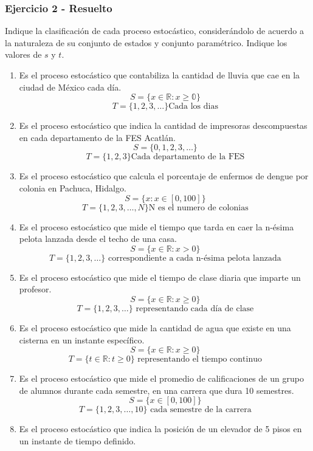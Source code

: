\documentclass{article}
\begin{document}
\subsubsection{Ejercicio 2 - Resuelto}

Indique la clasificación de cada proceso estocástico, considerándolo de acuerdo a la naturaleza de su conjunto de estados y conjunto paramétrico. Indique los valores de \( s \) y \( t \).

\begin{enumerate}
    \item Es el proceso estocástico que contabiliza la cantidad de lluvia que cae en la ciudad de México cada día.
          \[S = \{x \in \mathbb{R} : x \geq \mathbb{0}\}\]
          \[T = \{1,2,3,\dots\} \text{Cada los dias}\]
    \item Es el proceso estocástico que indica la cantidad de impresoras descompuestas en cada departamento de la FES Acatlán.
          \[S = \{0,1,2,3,\dots\} \]
          \[T = \{1,2,3\} \text{Cada departamento de la FES}\]
    \item Es el proceso estocástico que calcula el porcentaje de enfermos de dengue por colonia en Pachuca, Hidalgo.
          \[S = \{x : x \in [0, 100]\} \]
          \[T = \{1,2,3,\dots,N\} \text{N es el numero de colonias}\]
    \item Es el proceso estocástico que mide el tiempo que tarda en caer la n-ésima pelota lanzada desde el techo de una casa.
          \[S = \{x \in \mathbb{R} : x > 0\}\]
          \[ T = \{1,2,3,\dots\} \text{ correspondiente a cada n-ésima pelota lanzada} \]
    \item Es el proceso estocástico que mide el tiempo de clase diaria que imparte un profesor.
          \[ S = \{x \in \mathbb{R} : x \geq 0\} \]
          \[ T = \{1,2,3,\dots\} \text{ representando cada día de clase} \]
    \item Es el proceso estocástico que mide la cantidad de agua que existe en una cisterna en un instante específico.
          \[ S = \{x \in \mathbb{R} : x \geq 0\} \]
          \[ T = \{t \in \mathbb{R} : t \geq 0\} \text{ representando el tiempo continuo} \]
    \item Es el proceso estocástico que mide el promedio de calificaciones de un grupo de alumnos durante cada semestre, en una carrera que dura 10 semestres.
          \[ S = \{x \in [0, 100]\} \]
          \[ T = \{1,2,3,\dots,10\} \text{ cada semestre de la carrera} \]
    \item Es el proceso estocástico que indica la posición de un elevador de 5 pisos en un instante de tiempo definido.

\end{enumerate}
\end{document}
